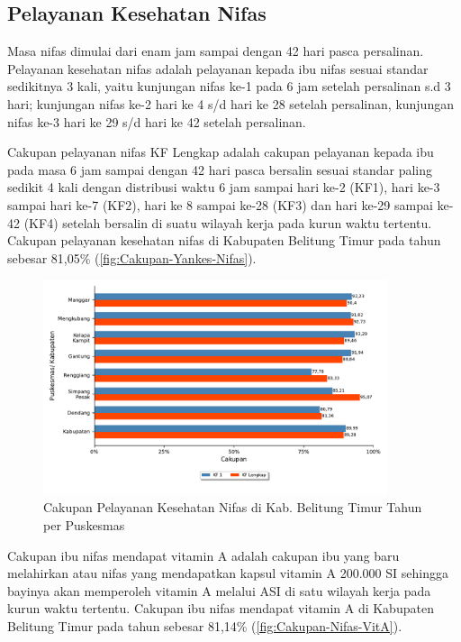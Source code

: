 \subsection{Pelayanan Kesehatan Nifas}
Masa nifas dimulai dari enam jam sampai dengan 42 hari pasca persalinan.
Pelayanan kesehatan nifas adalah pelayanan kepada ibu nifas sesuai standar sedikitnya 3 kali, yaitu kunjungan nifas ke-1 pada 6 jam setelah persalinan s.d 3 hari; kunjungan nifas ke-2 hari ke 4 s/d hari ke 28 setelah persalinan, kunjungan nifas ke-3 hari ke 29 s/d hari ke 42 setelah persalinan.

Cakupan pelayanan nifas KF Lengkap adalah cakupan pelayanan kepada ibu pada masa 6 jam sampai dengan 42 hari pasca bersalin sesuai standar paling sedikit 4 kali dengan distribusi waktu 6 jam sampai hari ke-2 (KF1), hari ke-3 sampai hari ke-7 (KF2), hari ke 8 sampai ke-28 (KF3) dan hari ke-29 sampai ke-42 (KF4) setelah bersalin di suatu wilayah kerja pada kurun waktu tertentu. Cakupan pelayanan kesehatan nifas di Kabupaten Belitung Timur pada tahun \tP sebesar 81,05\% (\autoref{fig:Cakupan-Yankes-Nifas}).%

\begin{figure}[H]
    \centering{}
    \includegraphics[width=0.9\textwidth]{bab_05/bab_05_05c_layanNifas}
    \caption{Cakupan Pelayanan Kesehatan Nifas di Kab. Belitung Timur Tahun \tP per Puskesmas}
    \label{fig:Cakupan-Yankes-Nifas}
\end{figure}

Cakupan ibu nifas mendapat vitamin A adalah cakupan ibu yang baru melahirkan atau nifas yang mendapatkan kapsul vitamin A 200.000 SI sehingga bayinya akan memperoleh vitamin A melalui ASI di satu wilayah kerja pada kurun waktu tertentu.
Cakupan ibu nifas mendapat vitamin A di Kabupaten Belitung Timur pada tahun \tP sebesar 81,14\% (\autoref{fig:Cakupan-Nifas-VitA}).

